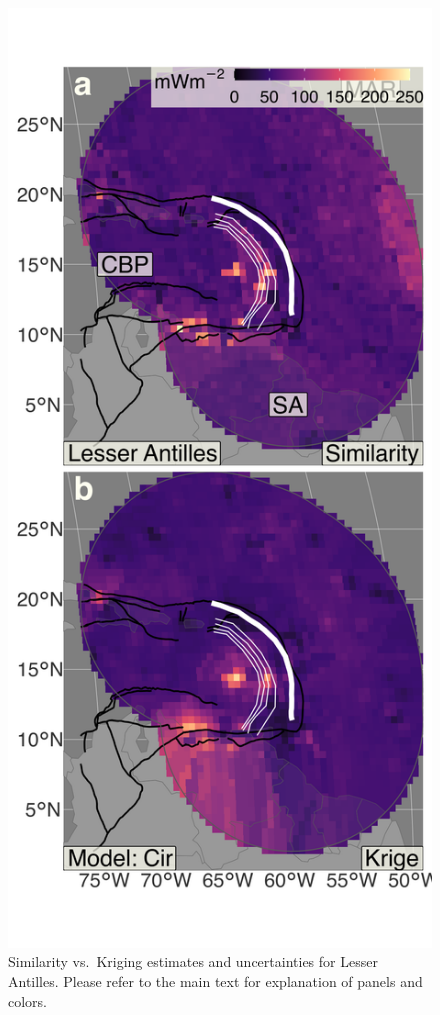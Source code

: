 \begin{figure}
\centering
\includegraphics{assets/figs/chpt3/LesserAntillesDiffComp.png}
\caption[Similarity vs.~Kriging estimates and uncertainties for Lesser Antilles]{Similarity vs.~Kriging estimates and uncertainties for Lesser Antilles. Please refer to the main text for explanation of panels and colors.}
\end{figure}

